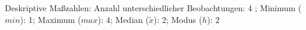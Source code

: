 				\label{tableValues:afin03}
				\vspace*{-\baselineskip}
                    \begin{noten}
                	    \note{} Deskriptive Maßzahlen:
                	    Anzahl unterschiedlicher Beobachtungen: 4%
                	    ; 
                	      Minimum ($min$): 1; 
                	      Maximum ($max$): 4; 
                	      Median ($\tilde{x}$): 2; 
                	      Modus ($h$): 2
                     \end{noten}


